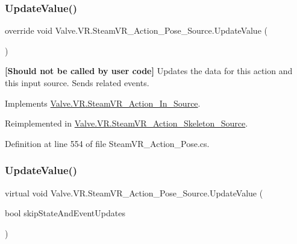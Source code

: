 \subsubsection{\texorpdfstring{UpdateValue()}{UpdateValue()}\hspace{0.1cm}{\footnotesize\ttfamily [1/2]}}
{\footnotesize\ttfamily override void Valve.\+V\+R.\+Steam\+V\+R\+\_\+\+Action\+\_\+\+Pose\+\_\+\+Source.\+Update\+Value (\begin{DoxyParamCaption}{ }\end{DoxyParamCaption})\hspace{0.3cm}{\ttfamily [virtual]}}



{\bfseries{\mbox{[}Should not be called by user code\mbox{]}}} Updates the data for this action and this input source. Sends related events. 



Implements \mbox{\hyperlink{class_valve_1_1_v_r_1_1_steam_v_r___action___in___source_a800b521715c6cbfe32e9b0b6db7e0a16}{Valve.\+V\+R.\+Steam\+V\+R\+\_\+\+Action\+\_\+\+In\+\_\+\+Source}}.



Reimplemented in \mbox{\hyperlink{class_valve_1_1_v_r_1_1_steam_v_r___action___skeleton___source_ab6af87a8b749735903ba744c168f7baa}{Valve.\+V\+R.\+Steam\+V\+R\+\_\+\+Action\+\_\+\+Skeleton\+\_\+\+Source}}.



Definition at line 554 of file Steam\+V\+R\+\_\+\+Action\+\_\+\+Pose.\+cs.

\mbox{\label{class_valve_1_1_v_r_1_1_steam_v_r___action___pose___source_a0254cddea71deac6f822536c4232a452}} 
\subsubsection{\texorpdfstring{UpdateValue()}{UpdateValue()}\hspace{0.1cm}{\footnotesize\ttfamily [2/2]}}
{\footnotesize\ttfamily virtual void Valve.\+V\+R.\+Steam\+V\+R\+\_\+\+Action\+\_\+\+Pose\+\_\+\+Source.\+Update\+Value (\begin{DoxyParamCaption}\item[{bool}]{skip\+State\+And\+Event\+Updates }\end{DoxyParamCaption})\hspace{0.3cm}{\ttfamily [virtual]}}



